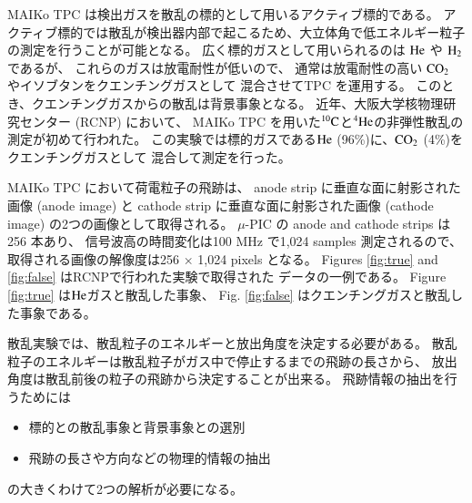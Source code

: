 \documentclass{jps-cp}
\begin{document}
MAIKo TPC は検出ガスを散乱の標的として用いるアクティブ標的である。
アクティブ標的では散乱が検出器内部で起こるため、大立体角で低エネルギー粒子の測定を行うことが可能となる。
広く標的ガスとして用いられるのは $\rm{He}$ や $\rm{H}_{2}$であるが、
これらのガスは放電耐性が低いので、
通常は放電耐性の高い $\rm{CO}_{2}$ やイソブタンをクエンチングガスとして
混合させてTPC を運用する。
このとき、クエンチングガスからの散乱は背景事象となる。
近年、大阪大学核物理研究センター (RCNP) において、
MAIKo TPC を用いた${}^{10}\rm{C}$と${}^{4}\rm{He}$の非弾性散乱の測定が初めて行われた。
この実験では標的ガスである$\rm{He}$ (96\%)に、$\rm{CO}_{2}$ (4\%)をクエンチングガスとして
混合して測定を行った。

MAIKo TPC において荷電粒子の飛跡は、
anode strip に垂直な面に射影された画像 (anode image) と
cathode strip に垂直な面に射影された画像 (cathode image) の2つの画像として取得される。
$\mu$-PIC の anode and cathode strips は256 本あり、
信号波高の時間変化は100 MHz で1,024 samples 測定されるので、
取得される画像の解像度は256 $\times$ 1,024 pixels となる。
Figures \ref{fig:true} and \ref{fig:false} はRCNPで行われた実験で取得された
データの一例である。
Figure \ref{fig:true} は$\rm{He}$ガスと散乱した事象、
Fig. \ref{fig:false} はクエンチングガスと散乱した事象である。

散乱実験では、散乱粒子のエネルギーと放出角度を決定する必要がある。
散乱粒子のエネルギーは散乱粒子がガス中で停止するまでの飛跡の長さから、
放出角度は散乱前後の粒子の飛跡から決定することが出来る。
飛跡情報の抽出を行うためには
\begin{itemize}
\item 標的との散乱事象と背景事象との選別
\item 飛跡の長さや方向などの物理的情報の抽出
\end{itemize}
の大きくわけて2つの解析が必要になる。
\end{document}
